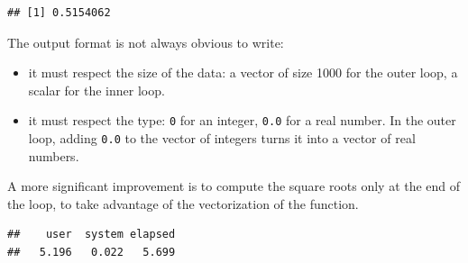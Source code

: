 \documentclass[
  12pt,
  american,
  a4paper,
  extrafontsizes,onecolumn,openright
  ]{memoir}
\newenvironment{Shaded}{\begin{snugshade}}{\end{snugshade}}
\newcommand{\ControlFlowTok}[1]{\textcolor[rgb]{0.13,0.29,0.53}{\textbf{#1}}}
\newcommand{\DecValTok}[1]{\textcolor[rgb]{0.00,0.00,0.81}{#1}}
\newcommand{\FunctionTok}[1]{\textcolor[rgb]{0.00,0.00,0.00}{#1}}
\newcommand{\NormalTok}[1]{#1}
\newcommand{\OtherTok}[1]{\textcolor[rgb]{0.56,0.35,0.01}{#1}}
\newcommand{\SpecialCharTok}[1]{\textcolor[rgb]{0.00,0.00,0.00}{#1}}
\providecommand{\tightlist}{%
  \setlength{\itemsep}{0pt}\setlength{\parskip}{0pt}}
\begin{document}
\begin{verbatim}
## [1] 0.5154062
\end{verbatim}

\normalsize

The output format is not always obvious to write:

\begin{itemize}
\tightlist
\item
  it must respect the size of the data: a vector of size 1000 for the outer loop, a scalar for the inner loop.
\item
  it must respect the type: \texttt{0} for an integer, \texttt{0.0} for a real number. In the outer loop, adding \texttt{0.0} to the vector of integers turns it into a vector of real numbers.
\end{itemize}

A more significant improvement is to compute the square roots only at the end of the loop, to take advantage of the vectorization of the function.

\scriptsize

\begin{Shaded}
\end{Shaded}

\begin{verbatim}
##    user  system elapsed 
##   5.196   0.022   5.699
\end{verbatim}
\end{document}
